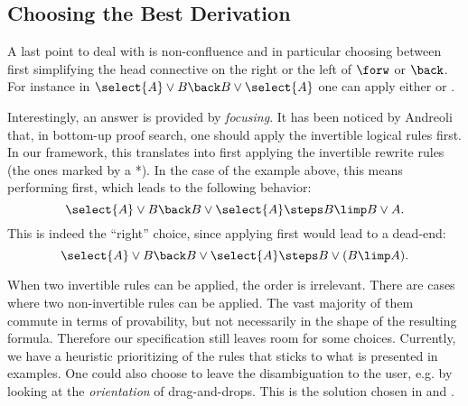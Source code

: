 
\subsection{Choosing the Best Derivation}

A last point to deal with is non-confluence and in particular choosing
between first simplifying the head connective on the right or the left
of $\forw$ or $\back$. For instance in
$\select{A}\lor B \back B\lor\select{A}$ one can apply either
 or .

Interestingly, an answer is provided by {\em
  focusing}. It has been noticed by Andreoli~\cite{andreoli1992} that, in
bottom-up proof search, one should apply the invertible logical
rules first. In our framework, this translates into first applying the
invertible rewrite rules (the ones marked by a *).  In the case of the
example above, this means performing  first, which
leads to the following behavior:
$$\select{A}\lor B \back B\lor\select{A}\steps B\limp B\lor A.$$
This is indeed the ``right'' choice, since applying 
first would lead to a dead-end:
$$\select{A}\lor B \back B\lor\select{A}\steps B\lor(B\limp A).$$

When two invertible rules can be applied, the order is irrelevant. There are
cases where two non-invertible rules can be applied. The vast majority of them
commute in terms of provability, but not necessarily in the shape of the
resulting formula. Therefore our specification still leaves
room for some choices. Currently, we have a heuristic prioritizing of the rules
that sticks to what is presented in examples. One could also choose to leave the
disambiguation to the user, e.g. by looking at the \emph{orientation} of
drag-and-drops. This is the solution chosen in \cite{Chaudhuri2013} and
\cite{DBLP:conf/cade/Chaudhuri21}.

